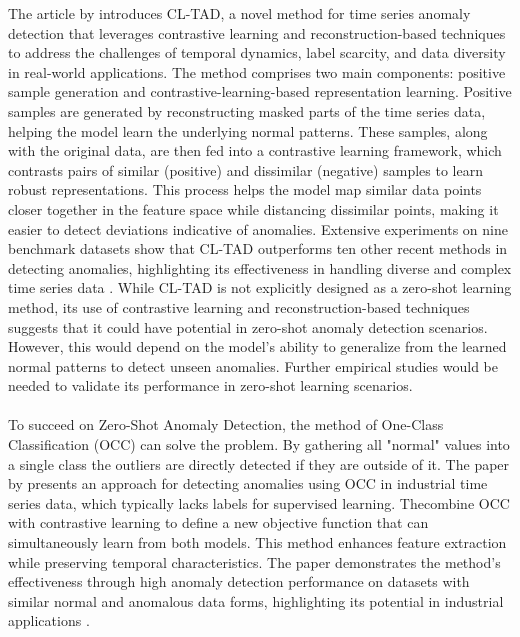 The article by  introduces CL-TAD, a novel method for time series anomaly detection that leverages contrastive learning and reconstruction-based techniques to address the challenges of temporal dynamics, label scarcity, and data diversity in real-world applications. The method comprises two main components: positive sample generation and contrastive-learning-based representation learning. Positive samples are generated by reconstructing masked parts of the time series data, helping the model learn the underlying normal patterns. These samples, along with the original data, are then fed into a contrastive learning framework, which contrasts pairs of similar (positive) and dissimilar (negative) samples to learn robust representations. This process helps the model map similar data points closer together in the feature space while distancing dissimilar points, making it easier to detect deviations indicative of anomalies. Extensive experiments on nine benchmark datasets show that CL-TAD outperforms ten other recent methods in detecting anomalies, highlighting its effectiveness in handling diverse and complex time series data \cite{ngu_cl-tad_2023}.
While CL-TAD is not explicitly designed as a zero-shot learning method, its use of contrastive learning and reconstruction-based techniques suggests that it could have potential in zero-shot anomaly detection scenarios. However, this would depend on the model's ability to generalize from the learned normal patterns to detect unseen anomalies. Further empirical studies would be needed to validate its performance in zero-shot learning scenarios.\\\\
To succeed on Zero-Shot Anomaly Detection, the method of One-Class Classification (OCC) can solve the problem. %
By gathering all "normal" values into a single class the outliers are directly detected if they are outside of it. The paper by  presents an approach for detecting anomalies using OCC in industrial time series data, which typically lacks labels for supervised learning. Thecombine OCC with contrastive learning to define a new objective function that can simultaneously learn from both models. This method enhances feature extraction while preserving temporal characteristics. The paper demonstrates the method's effectiveness through high anomaly detection performance on datasets with similar normal and anomalous data forms, highlighting its potential in industrial applications \cite{lee_time_2023}.\\\\
